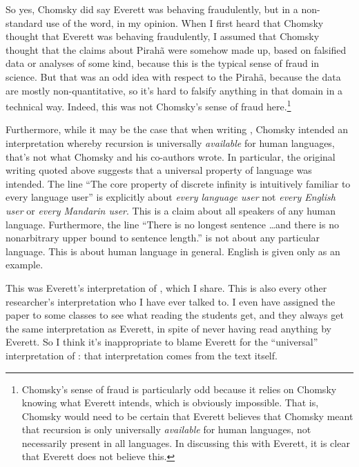 \documentclass{article}
\begin{document}
So yes, Chomsky did say Everett was behaving fraudulently, but in a non-standard use of the word, in my opinion. When I first heard that Chomsky thought that Everett was behaving fraudulently, I assumed that Chomsky thought that the claims about Pirahã were somehow made up, based on falsified data or analyses of some kind, because this is the typical sense of fraud in science.  But that was an odd idea with respect to the Pirahã, because the data are mostly non-quantitative, so it's hard to falsify anything in that domain in a technical way. Indeed, this was not Chomsky's sense of fraud here.\footnote{Chomsky's sense of fraud is particularly odd because it relies on Chomsky knowing what Everett intends, which is obviously impossible. That is, Chomsky would need to be certain that Everett believes that Chomsky meant that recursion is only universally \textit{available} for human languages, not necessarily present in all languages. In discussing this with Everett, it is clear that Everett does not believe this.}

Furthermore, while it may be the case that when writing \cite{hauser2002faculty}, Chomsky intended an interpretation whereby recursion is universally \textit{available} for human languages, that's not what Chomsky and his co-authors wrote.
In particular, the original writing quoted above suggests that a universal property of language was intended. The line ``The core property of discrete infinity is intuitively familiar to every language user'' is explicitly about \textit{every language user} not \textit{every English user} or \textit{every Mandarin user}.  This is a claim about all speakers of any human language. Furthermore, the line ``There is no longest sentence  \ldots  and there is no nonarbitrary upper bound to sentence length.'' is not about any particular language. This is about human language in general. English is given only as an example. 

This was Everett’s interpretation of \cite{hauser2002faculty}, which I share. This is also every other researcher’s interpretation who I have ever talked to. I even have assigned the \cite{hauser2002faculty} paper to some classes to see what reading the students get, and they always get the same interpretation as Everett, in spite of never having read anything by Everett.  So I think it’s inappropriate to blame Everett for the ``universal'' interpretation of \cite{hauser2002faculty}: that interpretation comes from the text itself. 
\end{document}
